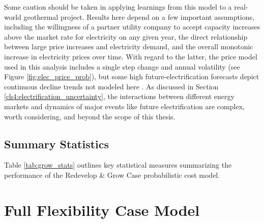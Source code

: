 Some caution should be taken in applying learnings from this model to a real-world geothermal project. Results here depend on a few important assumptions, including the willingness of a partner utility company to accept capacity increases above the market rate for electricity on any given year, the direct relationship between large price increases and electricity demand, and the overall monotonic increase in electricity prices over time. With regard to the latter, the price model used in this analysis includes a single step change and annual volatility (see Figure \ref{fig:elec_price_prob}), but some high future-electrification forecasts depict continuous decline trends not modeled here \citep{murphy_electrification_2021}. As discussed in Section \ref{ch4:electrification_uncertainty}, the interactions between different energy markets and dynamics of major events like future electrification are complex, worth considering, and beyond the scope of this thesis. 

\subsection{Summary Statistics}\label{ch6:grow_stats}

Table \ref{tab:grow_stats} outlines key statistical measures summarizing the performance of the Redevelop \& Grow Case probabilistic cost model.

\begin{table}[H]
\centering
{}
\caption[Redevelop \& Grow Case statistics]{Redevelop \& Grow case model statistics for 2000 model realizations. NPV$_s$ refers to the static model NPV reported in Section \ref{ch6:static_stats}.}
\label{tab:grow_stats}
\end{table}

\section{Full Flexibility Case Model}\label{ch6:reduce_case}

